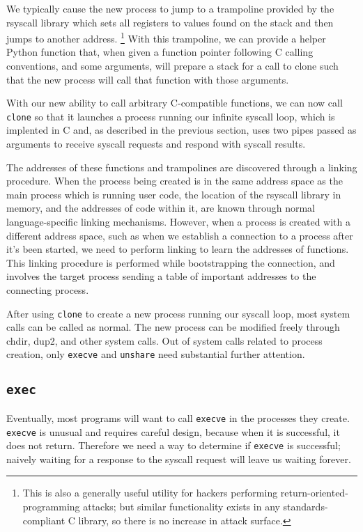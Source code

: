 \documentclass{acmart}
\begin{document}
We typically cause the new process to jump to a trampoline provided by the rsyscall library
which sets all registers to values found on the stack
and then jumps to another address.
\footnote{This is also a generally useful utility for hackers performing return-oriented-programming attacks;
but similar functionality exists in any standards-compliant C library,
so there is no increase in attack surface.}
With this trampoline,
we can provide a helper Python function that,
when given a function pointer following C calling conventions, and some arguments,
will prepare a stack for a call to clone such that the new process will call that function with those arguments.

With our new ability to call arbitrary C-compatible functions,
we can now call \texttt{clone} so that it launches a process running our infinite syscall loop,
which is implented in C and, as described in the previous section,
uses two pipes passed as arguments to receive syscall requests and respond with syscall results.

The addresses of these functions and trampolines are discovered through a linking procedure.
When the process being created is in the same address space as the main process which is running user code,
the location of the rsyscall library in memory, and the addresses of code within it,
are known through normal language-specific linking mechanisms.
However, when a process is created with a different address space,
such as when we establish a connection to a process after it's been started,
we need to perform linking to learn the addresses of functions.
This linking procedure is performed while bootstrapping the connection,
and involves the target process sending a table of important addresses to the connecting process.

After using \texttt{clone} to create a new process running our syscall loop,
most system calls can be called as normal.
The new process can be modified freely through chdir, dup2, and other system calls.
Out of system calls related to process creation,
only \texttt{execve} and \texttt{unshare} need substantial further attention.
\subsection{\texttt{exec}}
Eventually, most programs will want to call \texttt{execve} in the processes they create.
\texttt{execve} is unusual and requires careful design,
because when it is successful, it does not return.
Therefore we need a way to determine if \texttt{execve} is successful;
naively waiting for a response to the syscall request will leave us waiting forever.
\end{document}
